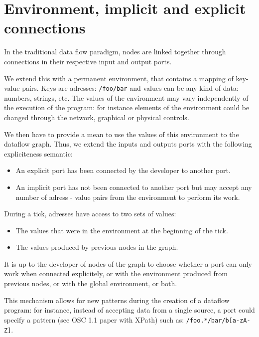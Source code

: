\documentclass{article}
\begin{document}
	\section{Environment, implicit and explicit connections}
    In the traditional data flow paradigm, nodes are linked together through connections in their respective input and output ports.
    
    We extend this with a permanent environment, that contains a mapping of key-value pairs. 
    Keys are adresses: \lstinline|/foo/bar| and values can be any kind of data: numbers, strings, etc. 
    The values of the environment may vary independently of the execution of the program: for instance elements of the environment could be changed through the network, graphical or physical controls.
    
    We then have to provide a mean to use the values of this environment to the dataflow graph.
    Thus, we extend the inputs and outputs ports with the following expliciteness semantic: 
    
    \begin{itemize}
        \item An explicit port has been connected by the developer to another port.
        \item An implicit port has not been connected to another port but may accept any number of adress - value pairs from the environment to perform its work.
    \end{itemize}
    
    During a tick, adresses have access to two sets of values: 
    \begin{itemize}
        \item The values that were in the environment at the beginning of the tick.
        \item The values produced by previous nodes in the graph.
    \end{itemize}

    It is up to the developer of nodes of the graph to choose whether a port can only work when connected explicitely, or with the environment produced from previous nodes, or with the global environment, or both.

    This mechanism allows for new patterns during the creation of a dataflow program: for instance, instead of accepting data from a single source, a port could specify a pattern (see OSC 1.1 paper with XPath) such as: \lstinline|/foo.*/bar/b[a-zA-Z]|. 
	
\end{document}
